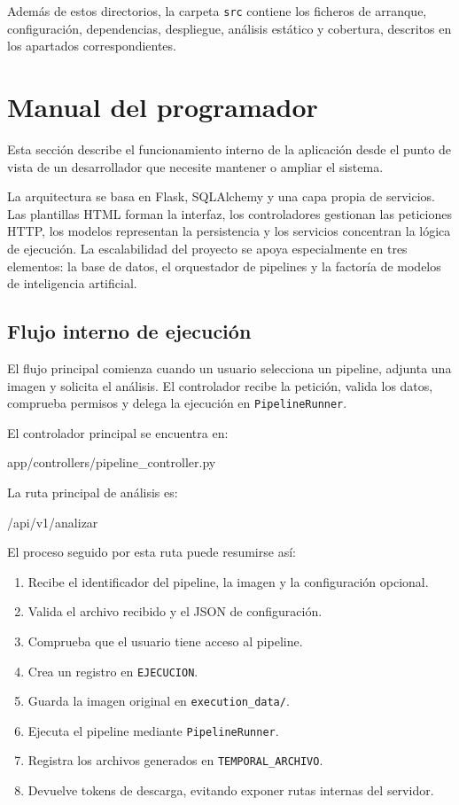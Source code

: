 Además de estos directorios, la carpeta \texttt{src} contiene los ficheros de arranque, configuración, dependencias, despliegue, análisis estático y cobertura, descritos en los apartados correspondientes.


\section{Manual del programador}

Esta sección describe el funcionamiento interno de la aplicación desde el punto de vista de un desarrollador que necesite mantener o ampliar el sistema.

La arquitectura se basa en Flask, SQLAlchemy y una capa propia de servicios. Las plantillas HTML forman la interfaz, los controladores gestionan las peticiones HTTP, los modelos representan la persistencia y los servicios concentran la lógica de ejecución. La escalabilidad del proyecto se apoya especialmente en tres elementos: la base de datos, el orquestador de pipelines y la factoría de modelos de inteligencia artificial.

\subsection{Flujo interno de ejecución}

El flujo principal comienza cuando un usuario selecciona un pipeline, adjunta una imagen y solicita el análisis. El controlador recibe la petición, valida los datos, comprueba permisos y delega la ejecución en \texttt{PipelineRunner}.

El controlador principal se encuentra en:

\begin{bloqueCodigo}[title={Controlador principal}]
	app/controllers/pipeline_controller.py
\end{bloqueCodigo}

La ruta principal de análisis es:

\begin{bloqueCodigo}[title={Endpoint principal de análisis}]
	/api/v1/analizar
\end{bloqueCodigo}

El proceso seguido por esta ruta puede resumirse así:

\begin{enumerate}
	\item Recibe el identificador del pipeline, la imagen y la configuración opcional.
	\item Valida el archivo recibido y el JSON de configuración.
	\item Comprueba que el usuario tiene acceso al pipeline.
	\item Crea un registro en \texttt{EJECUCION}.
	\item Guarda la imagen original en \texttt{execution\_data/}.
	\item Ejecuta el pipeline mediante \texttt{PipelineRunner}.
	\item Registra los archivos generados en \texttt{TEMPORAL\_ARCHIVO}.
	\item Devuelve tokens de descarga, evitando exponer rutas internas del servidor.
\end{enumerate}

